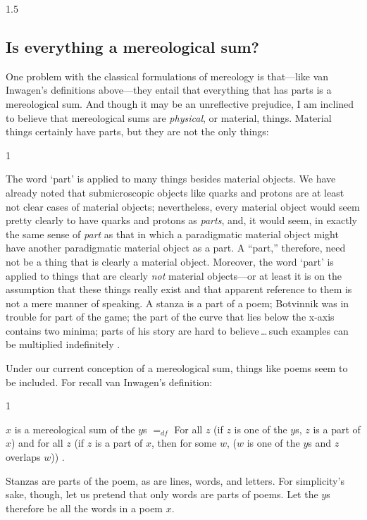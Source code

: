 \documentclass[11pt]{article}
\newenvironment{squote}{%
\begin{spacing}{1}
\begin{list}{}{%
\setlength{\labelwidth}{0pt}%
\rightmargin\leftmargin%
}
\item\relax
}{%
\end{list}%
\end{spacing}
}
\begin{document}
\begin{spacing}{1.5}
\subsection{Is everything a mereological sum?}
\label{all-sum}
One problem with the classical formulations of mereology is
that---like van Inwagen's definitions above---they entail that
everything that has parts is a mereological sum.  And though it may be
an unreflective prejudice, I am inclined to believe that mereological
sums are {\em physical}, or material, things.  Material things
certainly have parts, but they are not the only things:

\begin{squote}
The word `part' is applied to many things besides material objects.
We have already noted that submicroscopic objects like quarks and
protons are at least not clear cases of material objects;
nevertheless, every material object would seem pretty clearly to have
quarks and protons as \emph{parts}, and, it would seem, in exactly the
same sense of \emph{part} as that in which a paradigmatic material
object might have another paradigmatic material object as a part.  A
``part,'' therefore, need not be a thing that is clearly a material
object.  Moreover, the word `part' is applied to things that are
clearly \emph{not} material objects---or at least it is on the
assumption that these things really exist and that apparent reference
to them is not a mere manner of speaking.  A stanza is a part of a
poem; Botvinnik was in trouble for part of the game; the part of the
curve that lies below the x-axis contains two minima; parts of his
story are hard to believe\,\ldots\,such examples can be multiplied
indefinitely \citeyearpar[18--19]{inwagen1995}.
\end{squote}

Under our current conception of a mereological sum, things like poems
seem to be included.  For recall van Inwagen's definition:

\begin{squote}
$x$ is a mereological sum of the $y$s $=_{df}$ For all $z$ (if $z$ is
  one of the $y$s, $z$ is a part of $x$) and for all $z$ (if $z$ is a
  part of $x$, then for some $w$, ($w$ is one of the $y$s and $z$
  overlaps $w$)) \citeyearpar[618--619]{inwagen2006}.
\end{squote}

Stanzas are parts of the poem, as are lines, words, and letters.  For
simplicity's sake, though, let us pretend that only words are parts of
poems.  Let the $y$s therefore be all the words in a poem $x$.


\end{spacing}
\end{document}

